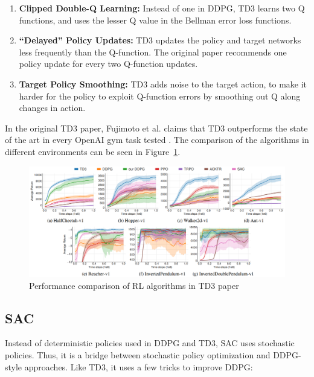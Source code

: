 \documentclass[12pt,twoside]{report}
\begin{document}
\begin{enumerate}
  \item \textbf{Clipped Double-Q Learning:} Instead of one in DDPG, TD3 learns two Q functions, and uses the lesser Q value in the Bellman error loss functions.
  \item \textbf{“Delayed” Policy Updates:} TD3 updates the policy and target networks less frequently than the Q-function. The original paper recommends one policy update for every two Q-function updates.
  \item \textbf{Target Policy Smoothing:} TD3 adds noise to the target action, to make it harder for the policy to exploit Q-function errors by smoothing out Q along changes in action.
\end{enumerate}

In the original TD3 paper, Fujimoto et al. claims that TD3 outperforms the state of the art in every OpenAI gym task tested \cite{td3}. The comparison of the algorithms in different environments can be seen in Figure~\ref{fig:td3-comparisons}.

\begin{figure}[h]
\centering
\includegraphics[width = \hsize]{figures/td3 comparison.png}
\caption{Performance comparison of RL algorithms in TD3 paper \cite{td3}}
\label{fig:td3-comparisons}
\end{figure}


\subsection{SAC}
Instead of deterministic policies used in DDPG and TD3, SAC uses stochastic policies. Thus, it is a bridge between stochastic policy optimization and DDPG-style approaches. Like TD3, it uses a few tricks to improve DDPG: \cite{openai:sac}
\end{document}
